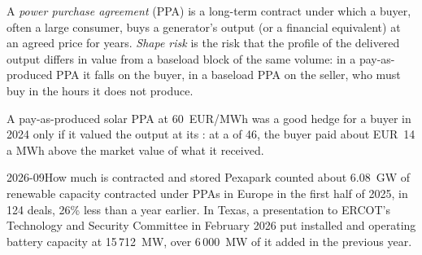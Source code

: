 \begin{omfigure}

\label{fig:m3:power-markets-trading:capture}
\end{omfigure}

\begin{definition}\label{def:m3:power-markets-trading:ppa}
A \emph{power purchase agreement} (PPA) is a long-term contract
under which a buyer, often a large consumer, buys a generator's output (or a financial
equivalent) at an agreed price for years. \emph{Shape risk} is the risk
that the profile of the delivered output differs in value from a baseload block of the same
volume: in a pay-as-produced PPA it falls on the buyer, in a baseload PPA on the seller, who
must buy in the hours it does not produce.
\end{definition}

A pay-as-produced solar PPA at \qty{60}{EUR/MWh} was a good hedge for a buyer in 2024 only if
it valued the output at its : at a  of 46, the buyer paid about
EUR~14 a MWh above the market value of what it received.

\begin{dated}{2026-09}{How much is contracted and stored}\label{dat:m3:power-markets-trading:ppa}
Pexapark counted about 6.08~GW of renewable capacity contracted under PPAs in Europe in the first half of 2025, in 124 deals, 26\% less than a
year earlier. In Texas, a presentation to ERCOT's Technology and Security Committee in February 2026 put installed and operating battery capacity at
15\,712~MW, over 6\,000~MW of it added in the previous year.
\end{dated}

